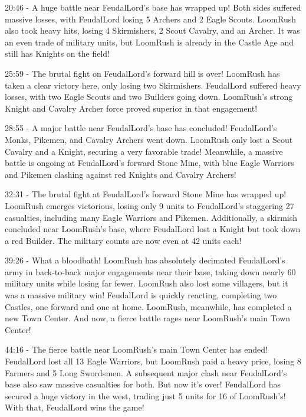 20:46 - A huge battle near FeudalLord's base has wrapped up! Both sides suffered massive losses, with FeudalLord losing 5 Archers and 2 Eagle Scouts. LoomRush also took heavy hits, losing 4 Skirmishers, 2 Scout Cavalry, and an Archer. It was an even trade of military units, but LoomRush is already in the Castle Age and still has Knights on the field! \par \vspace{1em}

25:59 - The brutal fight on FeudalLord's forward hill is over! LoomRush has taken a clear victory here, only losing two Skirmishers. FeudalLord suffered heavy losses, with two Eagle Scouts and two Builders going down. LoomRush's strong Knight and Cavalry Archer force proved superior in that engagement! \par \vspace{1em}

28:55 - A major battle near FeudalLord's base has concluded! FeudalLord's Monks, Pikemen, and Cavalry Archers went down. LoomRush only lost a Scout Cavalry and a Knight, securing a very favorable trade! Meanwhile, a massive battle is ongoing at FeudalLord's forward Stone Mine, with blue Eagle Warriors and Pikemen clashing against red Knights and Cavalry Archers! \par \vspace{1em}

32:31 - The brutal fight at FeudalLord's forward Stone Mine has wrapped up! LoomRush emerges victorious, losing only 9 units to FeudalLord's staggering 27 casualties, including many Eagle Warriors and Pikemen. Additionally, a skirmish concluded near LoomRush's base, where FeudalLord lost a Knight but took down a red Builder. The military counts are now even at 42 units each! \par \vspace{1em}

39:26 - What a bloodbath! LoomRush has absolutely decimated FeudalLord's army in back-to-back major engagements near their base, taking down nearly 60 military units while losing far fewer. LoomRush also lost some villagers, but it was a massive military win! FeudalLord is quickly reacting, completing two Castles, one forward and one at home. LoomRush, meanwhile, has completed a new Town Center. And now, a fierce battle rages near LoomRush's main Town Center! \par \vspace{1em}

44:16 - The fierce battle near LoomRush's main Town Center has ended! FeudalLord lost all 13 Eagle Warriors, but LoomRush paid a heavy price, losing 8 Farmers and 5 Long Swordsmen. A subsequent major clash near FeudalLord's base also saw massive casualties for both. But now it's over! FeudalLord has secured a huge victory in the west, trading just 5 units for 16 of LoomRush's! With that, FeudalLord wins the game! \par \vspace{1em}

